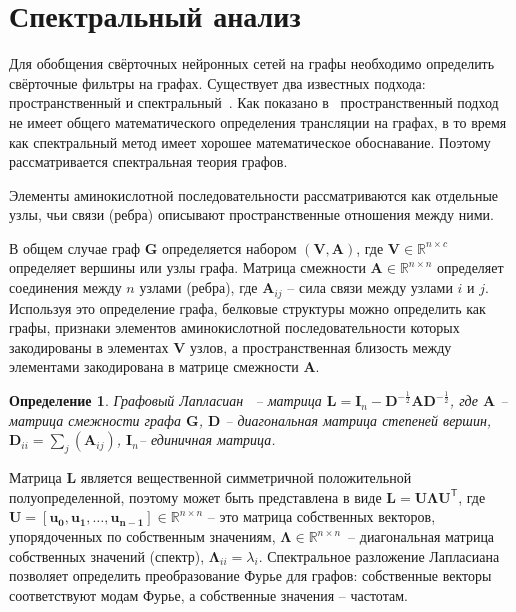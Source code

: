 \documentclass[14pt]{extarticle}
\newtheorem{Def}{Определение}
\begin{document}
\section{Спектральный анализ}

Для обобщения свёрточных нейронных сетей на графы необходимо определить свёрточные фильтры на графах. Существует два известных подхода: пространственный и спектральный~\cite{DBLP:journals/corr/abs-1901-00596, DBLP:journals/corr/abs-1812-08434}. Как показано в~\cite{ae482107de73461787258f805cf8f4ed} пространственный подход не имеет общего математического определения трансляции на графах, в то время как  спектральный метод имеет хорошее математическое обоснавание. Поэтому рассматривается спектральная теория графов.

Элементы аминокислотной последовательности рассматриваются как отдельные узлы, чьи связи (ребра) описывают пространственные отношения между ними. 

В общем случае граф $\mathbf{G}$ определяется набором $\mathbf{(V, A)}$, где $\mathbf{V}\in \mathbb{R}^{n \times c}$ определяет вершины или узлы графа. Матрица смежности $\mathbf{A}\in \mathbb{R}^{n \times n}$ определяет соединения между $n$ узлами (ребра), где $\mathbf{A}_{ij}$ – сила связи между узлами $i$ и $j$. Используя это определение графа, белковые структуры можно определить как графы, признаки элементов аминокислотной последовательности которых закодированы в элементах $\mathbf{V}$ узлов, а пространственная близость между элементами закодирована в матрице смежности $\mathbf{A}$.

\begin{Def}
	\textit{Графовый Лапласиан}~\cite{Chung:1997} -- матрица $\mathbf{L}=\mathbf{I}_{n}-\mathbf{D}^{-\frac{1}{2}} \mathbf{A} \mathbf{D}^{-\frac{1}{2}}$, где $\mathbf{A}$ -- матрица смежности графа $\mathbf{G}$,  $\mathbf{D}$ -- диагональная матрица степеней вершин, $\mathbf{D}_{i i}=\sum_{j}\left(\mathbf{A}_{i j}\right)$, $\mathbf{I}_{n}$-- единичная матрица.
\end{Def}

Матрица $\mathbf{L}$ является вещественной симметричной положительной полуопределенной, поэтому может быть представлена в виде  $\mathbf{L}=\mathbf{U} \boldsymbol{\Lambda} \mathbf{U}^{\mathsf{T}} $, где $\mathbf{U}=\left[\mathbf{u}_{\mathbf{0}}, \mathbf{u}_{\mathbf{1}}, \dots, \mathbf{u}_{\mathbf{n}-\mathbf{1}}\right] \in \mathbb{R}^{n \times n}$ -- это матрица собственных векторов, упорядоченных по собственным значениям, $\boldsymbol{\Lambda} \in \mathbb{R}^{n \times n}$~-- диагональная матрица собственных значений (спектр), $\boldsymbol{\Lambda}_{i i}=\lambda_{i}$. Спектральное разложение Лапласиана позволяет определить преобразование Фурье для графов: собственные векторы соответствуют модам Фурье, а собственные значения -- частотам. 
\end{document}
